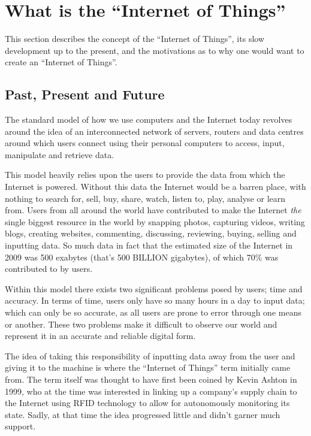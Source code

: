 \section{What is the ``Internet of Things''} %
\label{sec:internet_of_things_paradigm}
This section describes the concept of the ``Internet of Things'', its slow development up to the present, and the motivations as to why one would want to create an ``Internet of Things''.

\subsection{Past, Present and Future} %
\label{sub:past_present_and_future}

The standard model of how we use computers and the Internet today revolves around the idea of an interconnected network of servers, routers and data centres around which users connect using their personal computers to access, input, manipulate and retrieve data. 

This model heavily relies upon the users to provide the data from which the Internet is powered. Without this data the Internet would be a barren place, with nothing to search for, sell, buy, share, watch, listen to, play, analyse or learn from.
Users from all around the world have contributed to make the Internet \textit{the} single biggest resource in the world by snapping photos, capturing videos, writing blogs, creating websites, commenting, discussing, reviewing, buying, selling and inputting data. So much data in fact that the estimated size of the Internet in 2009 was 500 exabytes (that's 500 BILLION gigabytes), of which 70\% was contributed to by users.\cite{Size}   

Within this model there exists two significant problems posed by users; time and accuracy. In terms of time, users only have so many hours in a day to input data; which can only be so accurate, as all users are prone to error through one means or another.
These two problems make it difficult to observe our world and represent it in an accurate and reliable digital form.

The idea of taking this responsibility of inputting data away from the user and giving it to the machine is where the ``Internet of Things'' term initially came from. The term itself was thought to have first been coined by Kevin Ashton\cite{K.Ashton} in 1999, who at the time was interested in linking up a company's supply chain to the Internet using RFID technology to allow for autonomously monitoring its state.
Sadly, at that time the idea progressed little and didn't garner much support.

